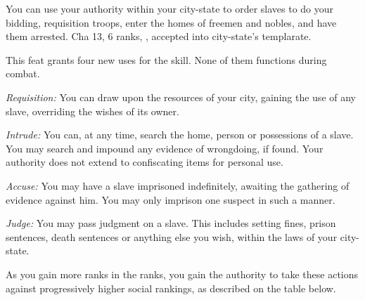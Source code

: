 {You can use your authority within your city-state to order slaves to do your bidding, requisition troops, enter the homes of freemen and nobles, and have them arrested.}
{Cha 13,  6 ranks, , accepted into city-state's templarate.}
{This feat grants four new uses for the  skill. None of them functions during combat.

\textit{Requisition:} You can draw upon the resources of your city, gaining the use of any slave, overriding the wishes of its owner.

\textit{Intrude:} You can, at any time, search the home, person or possessions of a slave. You may search and impound any evidence of wrongdoing, if found. Your authority does not extend to confiscating items for personal use.

\textit{Accuse:} You may have a slave imprisoned indefinitely, awaiting the gathering of evidence against him. You may only imprison one suspect in such a manner.

\textit{Judge:} You may pass judgment on a slave. This includes setting fines, prison sentences, death sentences or anything else you wish, within the laws of your city-state.

As you gain more ranks in the  ranks, you gain the authority to take these actions against progressively higher social rankings, as described on the table below.


}
